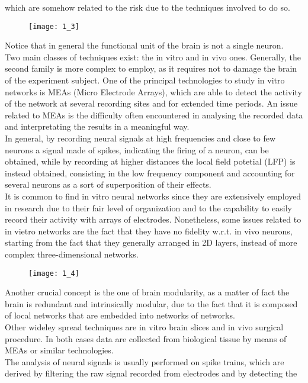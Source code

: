 which are somehow related to the risk due to the techniques involved to do so.
\begin{figure}[H]
    \texttt{[image: 1\_3]}
    \centering
\end{figure}
Notice that in general the functional unit of the brain is not a single neuron.\\
Two main classes of techniques exist: the in vitro and in vivo ones. Generally, the
second family is more complex to employ, as it requires not to damage the brain of
the experiment subject. One of the principal technologies to study in vitro networks
is MEAs (Micro Electrode Arrays), which are able to detect the activity
of the network at several recording sites and for extended time periods. An issue
related to MEAs is the difficulty often encountered in analysing the recorded data
and interpretating the results in a meaningful way.\\
In general, by recording neural signals at high frequencies and close to few
neurons a signal made of spikes, indicating the firing of a neuron, can be obtained,
while by recording at higher distances the local field potetial (LFP) is instead
obtained, consisting in the low frequency component and accounting for several
neurons as a sort of superposition of their effects.\\
It is common to find in vitro neural networks since they are extensively employed in
research due to their fair level of organization and to the capability to easily
record their activity with arrays of electrodes. Nonetheless, some issues related to
in vietro networks are the fact that they have no fidelity w.r.t. in vivo neurons,
starting from the fact that they generally arranged in 2D layers, instead of
more complex three-dimensional networks.
\begin{figure}[H]
    \texttt{[image: 1\_4]}
    \centering
\end{figure}
Another crucial concept is the one of brain modularity, as a matter of fact the brain
is redundant and intrinsically modular, due to the fact that it is composed of
local networks that are embedded into networks of networks.\\
Other wideley spread techniques are in vitro brain slices and in vivo surgical
procedure. In both cases data are collected from biological tissue by means of
MEAs or similar technologies.\\
The analysis of neural signals is usually performed on spike trains, which are
derived by filtering the raw signal recorded from electrodes and by detecting the
